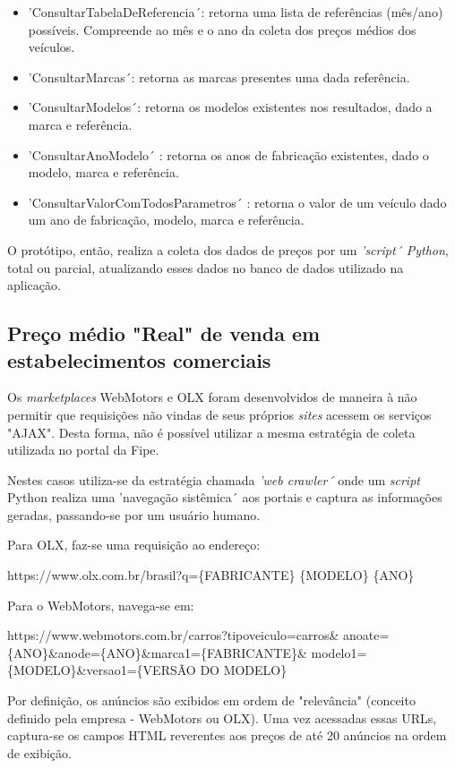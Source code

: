 \documentclass[conference]{IEEEtran}
\begin{document}
\begin{itemize}
	\item 'ConsultarTabelaDeReferencia´: retorna uma lista de referências (mês/ano) possíveis. Compreende ao mês e o ano da coleta dos preços médios dos veículos.
	\item 'ConsultarMarcas´: retorna as marcas presentes uma dada referência.
	\item 'ConsultarModelos´: retorna os modelos existentes nos resultados, dado a marca e referência.
	\item 'ConsultarAnoModelo´ : retorna os anos de fabricação existentes, dado o modelo, marca e referência.
	\item 'ConsultarValorComTodosParametros´ : retorna o valor de um veículo dado um ano de fabricação, modelo, marca e referência. 
\end{itemize}

O protótipo, então, realiza a coleta dos dados de preços por um \textit{'script´ Python}, total ou parcial, atualizando esses dados no banco de dados utilizado na aplicação.


\subsection{Preço médio "Real" de venda em estabelecimentos comerciais}

Os \textit{marketplaces} WebMotors e OLX foram desenvolvidos de maneira à não permitir que requisições não vindas de seus próprios \textit{sites} acessem os serviços "AJAX". Desta forma, não é possível utilizar a mesma estratégia de coleta utilizada no portal da Fipe.

Nestes casos utiliza-se da estratégia chamada \textit{'web crawler´} onde um \textit{script} Python realiza uma 'navegação sistêmica´ aos portais e captura as informações geradas, passando-se por um usuário humano. 

Para OLX, faz-se uma requisição ao endereço:

https://www.olx.com.br/brasil?q=\{FABRICANTE\} \{MODELO\} \{ANO\}

Para o WebMotors, navega-se em:

https://www.webmotors.com.br/carros?tipoveiculo=carros\& anoate=\{ANO\}\&anode=\{ANO\}\&marca1=\{FABRICANTE\}\& modelo1=\{MODELO\}\&versao1=\{VERSÃO DO MODELO\}

Por definição, os anúncios são exibidos em ordem de "relevância" (conceito definido pela empresa - WebMotors ou OLX). Uma vez acessadas essas URLs, captura-se os campos HTML reverentes aos preços de até 20 anúncios na ordem de exibição.
\end{document}
